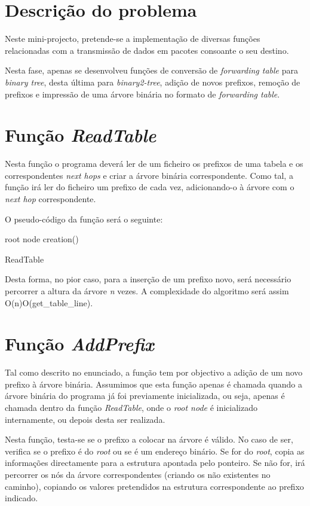 \documentclass[a4paper]{article}
\begin{document}

\section{Descrição do problema}
Neste mini-projecto, pretende-se a implementação de diversas funções relacionadas com a transmissão de dados em pacotes consoante
o seu destino.

Nesta fase, apenas se desenvolveu funções de conversão de \textit{forwarding table} para \textit{binary tree}, desta última para
\textit{binary2-tree}, adição de novos prefixos, remoção de prefixos e impressão de uma árvore binária no formato de
\textit{forwarding table}.

\section{Função \textit{ReadTable}}
Nesta função o programa deverá ler de um ficheiro os prefixos de uma tabela e os correspondentes \textit{next hops} e criar a 
árvore binária correspondente.
Como tal, a função irá ler do ficheiro um prefixo de cada vez, adicionando-o à árvore com o \textit{next hop} correspondente.

O pseudo-código da função será o seguinte:

\begin{algorithm}[H]
 root node creation()\;
 \caption{ReadTable}
\end{algorithm}
Desta forma, no pior caso, para a inserção de um prefixo novo, será necessário percorrer a altura da árvore \textit{n} vezes. A complexidade do algoritmo será assim O(n)O(get\_table\_line).

\section{Função \textit{AddPrefix}}
Tal como descrito no enunciado, a função tem por objectivo a adição de um novo prefixo à árvore binária. Assumimos que esta função apenas é chamada quando a árvore binária do programa já foi previamente inicializada, ou seja, apenas é chamada dentro da função \textit{ReadTable}, onde o \textit{root node} é inicializado internamente, ou depois desta ser realizada.

Nesta função, testa-se se o prefixo a colocar na árvore é válido. No caso de ser, verifica se o prefixo é do \textit{root} ou se é um endereço binário. Se for do \textit{root}, copia as informações directamente para a estrutura apontada pelo ponteiro. Se não for, irá percorrer os nós da árvore correspondentes (criando os não existentes no caminho), copiando os valores pretendidos na estrutura correspondente ao prefixo indicado.
\end{document}
